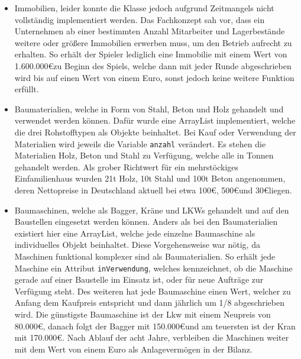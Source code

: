 \begin{itemize}
	 
\item Immobilien, leider konnte die Klasse jedoch aufgrund Zeitmangels nicht vollständig implementiert werden. Das Fachkonzept sah vor, dass ein Unternehmen ab einer bestimmten Anzahl Mitarbeiter und Lagerbestände weitere oder größere Immobilien erwerben muss, um den Betrieb aufrecht zu erhalten. So erhält der Spieler lediglich eine Immobilie mit einem Wert von 1.600.000\euro zu Beginn des Spiels, welche dann mit jeder Runde abgeschrieben wird bis auf einen Wert von einem Euro, sonst jedoch keine weitere Funktion erfüllt.

\item Baumaterialien, welche in Form von Stahl, Beton und Holz gehandelt und verwendet werden können. Dafür wurde eine ArrayList implementiert, welche die drei Rohstofftypen als Objekte beinhaltet. Bei Kauf oder Verwendung der Materialien wird jeweils die Variable \texttt{anzahl} verändert. Es stehen die Materialien Holz, Beton und Stahl zu Verfügung, welche alle in Tonnen gehandelt werden. Als grober Richtwert für ein mehrstöckiges Einfamilienhaus wurden 21t Holz, 10t Stahl und 100t Beton angenommen, deren Nettopreise in Deutschland aktuell bei etwa 100\euro, 500\euro und 30\euro  liegen.

\item Baumaschinen, welche als Bagger, Kräne und LKWs gehandelt und auf den Baustellen eingesetzt werden können. Anders als bei den Baumaterialien existiert hier eine ArrayList, welche jede einzelne Baumaschine als individuelles Objekt beinhaltet. Diese Vorgehensweise war nötig, da Maschinen funktional komplexer sind als Baumaterialien. So erhält jede Maschine ein Attribut \texttt{inVerwendung}, welches kennzeichnet, ob die Maschine gerade auf einer Baustelle im Einsatz ist, oder für neue Aufträge zur Verfügung steht. Des weiteren hat jede Baumaschine einen Wert, welcher zu Anfang dem Kaufpreis entspricht und dann jährlich um 1/8 abgeschrieben wird. Die günstigste Baumaschine ist der Lkw mit einem Neupreis von 80.000\euro, danach folgt der Bagger mit 150.000\euro und am teuersten ist der Kran mit 170.000\euro. Nach Ablauf der acht Jahre, verbleiben die Maschinen weiter mit dem Wert von einem Euro als Anlagevermögen in der Bilanz.


\end{itemize}
